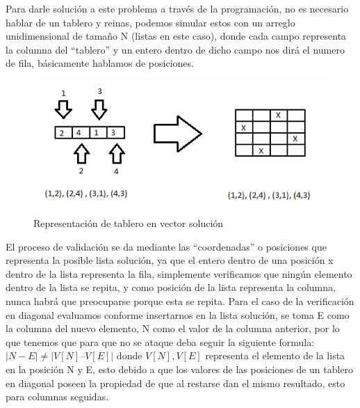 \documentclass[12pt,a4paper]{article}
\begin{document}
\begin{enumerate}
Para darle solución a este problema a través de la programación, no es necesario hablar de un tablero y reinas, podemos simular estos con un arreglo unidimensional de tamaño N (listas en este caso), donde cada campo representa la columna del “tablero” y un entero dentro de dicho campo nos dirá el numero de fila, básicamente hablamos de posiciones.

\begin{figure}[htp]
\centering
\graphicspath{ {imagenes/} }
\includegraphics[scale=0.70]{Vectores.png}
\caption{Representación de tablero en vector solución}
\label{foto}
\end{figure}

El proceso de validación se da mediante las “coordenadas” o posiciones que representa la posible lista solución, ya que el entero dentro de una posición x dentro de la lista representa la fila, simplemente verificamos que ningún elemento dentro de la lista se repita, y como posición de la lista representa la columna, nunca habrá que preocuparse porque esta se repita. Para el caso de la verificación en diagonal evaluamos conforme insertarnos en la lista solución, se toma E como la columna del nuevo elemento, N como el valor de la columna anterior, por lo que tenemos que para que no se ataque deba seguir la siguiente formula: $| N - E | \neq | V[N] – V[E]|$ donde $V[N],V[E]$ representa el elemento de la lista en la posición N y E, esto debido a que los valores de las posiciones de un tablero en diagonal poseen la propiedad de que al restarse dan el mismo resultado, esto para columnas seguidas.


\end{enumerate}
\end{document}
